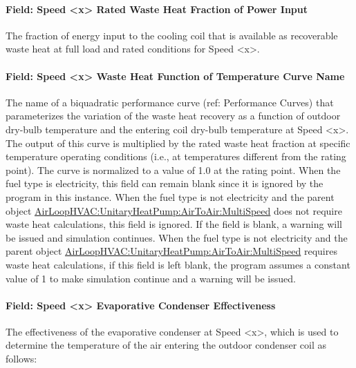 \paragraph{Field: Speed \textless{}x\textgreater{} Rated Waste Heat Fraction of Power Input}\label{field-speed-x-rated-waste-heat-fraction-of-power-input}

The fraction of energy input to the cooling coil that is available as recoverable waste heat at full load and rated conditions for Speed \textless{}x\textgreater{}.

\paragraph{Field: Speed \textless{}x\textgreater{} Waste Heat Function of Temperature Curve Name}\label{field-speed-x-waste-heat-function-of-temperature-curve-name}

The name of a biquadratic performance curve (ref: Performance Curves) that parameterizes the variation of the waste heat recovery as a function of outdoor dry-bulb temperature and the entering coil dry-bulb temperature at Speed \textless{}x\textgreater{}. The output of this curve is multiplied by the rated waste heat fraction at specific temperature operating conditions (i.e., at temperatures different from the rating point). The curve is normalized to a value of 1.0 at the rating point. When the fuel type is electricity, this field can remain blank since it is ignored by the program in this instance. When the fuel type is not electricity and the parent object \hyperref[airloophvacunitaryheatpumpairtoairmultispeed]{AirLoopHVAC:UnitaryHeatPump:AirToAir:MultiSpeed} does not require waste heat calculations, this field is ignored. If the field is blank, a warning will be issued and simulation continues. When the fuel type is not electricity and the parent object \hyperref[airloophvacunitaryheatpumpairtoairmultispeed]{AirLoopHVAC:UnitaryHeatPump:AirToAir:MultiSpeed} requires waste heat calculations, if this field is left blank, the program assumes a constant value of 1 to make simulation continue and a warning will be issued.

\paragraph{Field: Speed \textless{}x\textgreater{} Evaporative Condenser Effectiveness}\label{field-speed-x-evaporative-condenser-effectiveness}

The effectiveness of the evaporative condenser at Speed \textless{}x\textgreater{}, which is used to determine the temperature of the air entering the outdoor condenser coil as follows:

